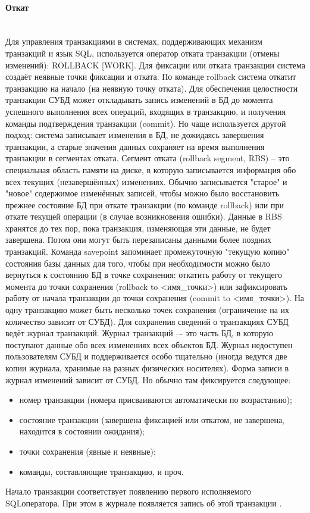 \paragraph{Откат} ~\\
Для управления транзакциями в системах, поддерживающих механизм
транзакций и язык SQL, используется оператор отката транзакции (отмены изменений): ROLLBACK [WORK]. Для фиксации или отката транзакции
система создаёт неявные точки фиксации и отката.
По команде rollback система откатит транзакцию на начало (на неявную точку
отката).
Для обеспечения целостности транзакции СУБД может откладывать запись
изменений в БД до момента успешного выполнения всех операций, входящих в
транзакцию, и получения команды подтверждения транзакции (commit). Но
чаще используется другой подход: система записывает изменения в БД, не
дожидаясь завершения транзакции, а старые значения данных сохраняет на
время выполнения транзакции в сегментах отката.
Сегмент отката (rollback segment, RBS) – это специальная область памяти на
диске, в которую записывается информация обо всех текущих (незавершённых)
изменениях. Обычно записывается "старое" и "новое" содержимое изменённых
записей, чтобы можно было восстановить прежнее состояние БД при откате
транзакции (по команде rollback) или при откате текущей операции (в случае
возникновения ошибки). Данные в RBS хранятся до тех пор, пока транзакция,
изменяющая эти данные, не будет завершена. Потом они могут быть
перезаписаны данными более поздних транзакций.
Команда savepoint запоминает промежуточную "текущую копию" состояния
базы данных для того, чтобы при необходимости можно было вернуться к
состоянию БД в точке сохранения: откатить работу от текущего момента до
точки сохранения (rollback to <имя\_точки>) или зафиксировать работу от начала
транзакции до точки сохранения (commit to <имя\_точки>). На одну транзакцию
может быть несколько точек сохранения (ограничение на их количество зависит
от СУБД). 
Для сохранения сведений о транзакциях СУБД ведёт журнал
транзакций. Журнал транзакций –- это часть БД, в которую поступают данные
обо всех изменениях всех объектов БД. Журнал недоступен пользователям
СУБД и поддерживается особо тщательно (иногда ведутся две копии журнала,
хранимые на разных физических носителях). Форма записи в журнал изменений
зависит от СУБД. Но обычно там фиксируется следующее:
\begin{itemize}
\item номер транзакции (номера присваиваются автоматически по возрастанию);
\item состояние транзакции (завершена фиксацией или откатом, не завершена,
находится в состоянии ожидания);
\item точки сохранения (явные и неявные);
\item команды, составляющие транзакцию, и проч.
\end{itemize}
Начало транзакции соответствует появлению первого исполняемого SQLоператора. При этом в журнале появляется запись об этой транзакции \autocite{Karpova2009}. 

